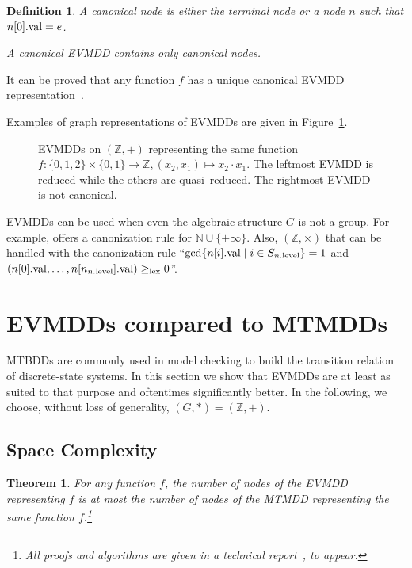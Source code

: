\documentclass[a4paper]{easychair}
\newcommand{\N}{\mathbb{N}}
\newcommand{\Z}{\mathbb{Z}}
\newcommand{\val}[1]{#1{\rm .val}}
\newcommand{\level}[1]{#1{\rm .level}}
\newtheorem{definition}{Definition}
\newtheorem{theorem}{Theorem}
\begin{document}
\begin{definition}\label{definition-reduced}
A \emph{canonical node} is either the terminal node or a node $n$ such 
that $\val{n[0]} = e$.

A \emph{canonical} EVMDD contains only canonical nodes.

\end{definition}

It can be proved that any function $f$ has a unique
canonical EVMDD representation~\cite{FMCAD2002}.

Examples of graph representations of EVMDDs are given in 
Figure~\ref{figure-reduced}.

\begin{figure}[htbp]
  \centering
    
  \caption{EVMDDs on $(\Z, +)$ representing the same function
   $f:\{0, 1, 2\}\times\{0, 1\}\rightarrow\Z, (x_2, x_1)\mapsto x_2\cdot x_1$.
   The leftmost EVMDD is reduced while the others are quasi--reduced.
   The rightmost EVMDD is not canonical.}
\label{figure-reduced}
\end{figure}

EVMDDs can be used when even the algebraic structure $G$ is not a group.
For example, \cite{FMCAD2002} offers a canonization rule for $\N\cup \{+\infty\}$.
Also, $(\Z, \times)$ that can be handled with the canonization rule
``${\rm gcd}\{\val{n[i]}\;|\; i \in S_{\level{n}}\} = 1$ and
$(\val{n[0]},\ldots, \val{n[n_{\level{n}}]}) \geq_{\rm lex} 0$''.

\section{EVMDDs compared to MTMDDs}

MTBDDs are commonly used in model checking to build the transition 
relation of discrete-state systems. In this section we show that EVMDDs 
are at least as suited to that purpose and oftentimes significantly 
better. In the following, we choose, without loss of generality, $(G, *) = (\Z, +)$.

\subsection{Space Complexity}

\begin{theorem}\label{th:spacecomplexity}
  \label{theorem-evmdd-smaller-than-add}
  For any function $f$, the number of nodes of the EVMDD representing $f$
  is at most the number of nodes of the MTMDD representing the same function 
$f$.\footnote{All proofs and algorithms are given in a technical report~\cite{Roux10}, to appear.}
\end{theorem}
\end{document}
